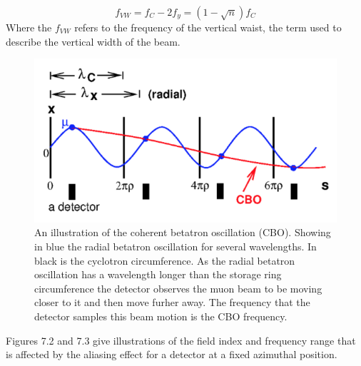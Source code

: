 \begin{equation}
f_{VW} = f_{C} - 2f_{y} = (1 - \sqrt{n})f_{C}
\end{equation}
\noindent
Where the $f_{VW}$ refers to the frequency of the vertical waist, the term used to describe the vertical width of the beam.

\begin{figure}[th]
\centering
\includegraphics[scale=1.0]{Figures/CBOdiagram.png}
\decoRule
\caption{ An illustration of the coherent betatron oscillation (CBO). Showing in blue the radial betatron oscillation for several wavelengths. In black is the cyclotron circumference. As the radial betatron oscillation has a wavelength longer than the storage ring circumference the detector observes the muon beam to be moving closer to it and then move furher away. The frequency that the detector samples this beam motion is the CBO frequency.\cite{Reference29}}
\label{fig:CBOdiagram}
\end{figure}
Figures 7.2 and 7.3 give illustrations of the field index and frequency range that is affected by the aliasing effect for a detector at a fixed azimuthal position. 

